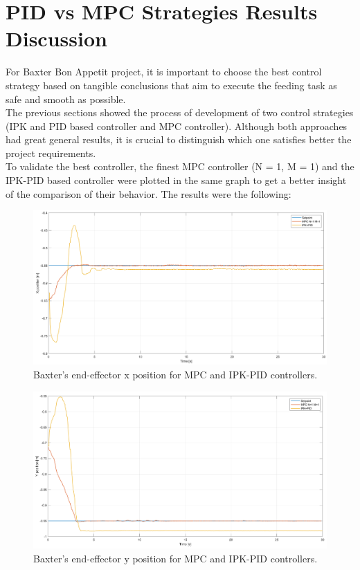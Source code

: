 \documentclass[11pt]{report} %
\begin{document}
\section{PID vs MPC Strategies Results Discussion}

For Baxter Bon Appetit project, it is important to choose the best control strategy based on tangible conclusions that aim to execute the feeding task as safe and smooth as possible. \\

The previous sections showed the process of development of two control strategies (IPK and PID based controller and MPC controller). Although both approaches had great general results, it is crucial to distinguish which one satisfies better the project requirements. \\

To validate the best controller, the finest MPC controller (N = 1, M = 1) and the IPK-PID based controller were plotted in the same graph to get a better insight of the comparison of their behavior. The results were the following:

\begin{figure}[H]
    \centering
    \includegraphics[width=1.0\linewidth]{assets/imgs/control_theory/mpc_vs_pid/x_pose.png}
    \caption{Baxter's end-effector x position for MPC and IPK-PID controllers.} 
    \label{fig_baxter_x_pose_mpc_pid_experiments}
\end{figure}

\begin{figure}[H]
    \centering
    \includegraphics[width=1.0\linewidth]{assets/imgs/control_theory/mpc_vs_pid/y_pose.png}
    \caption{Baxter's end-effector y position for MPC and IPK-PID controllers.} 
    \label{fig_baxter_y_pose_mpc_pid_experiments}
\end{figure}
\end{document}
